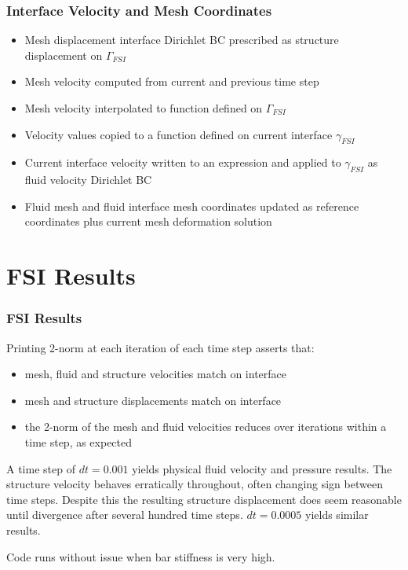 \documentclass{beamer}
\begin{document}
\begin{frame}
\frametitle{Interface Velocity and Mesh Coordinates}

\begin{itemize}
\item Mesh displacement interface Dirichlet BC prescribed as structure displacement on $\Gamma_{FSI}$
\item Mesh velocity computed from current and previous time step
\item Mesh velocity interpolated to function defined on $\Gamma_{FSI}$
\item Velocity values copied to a function defined on current interface $\gamma_{FSI}$
\item Current interface velocity written to an expression and applied to $\gamma_{FSI}$ as fluid velocity Dirichlet BC
\item Fluid mesh and fluid interface mesh coordinates updated as reference coordinates plus current mesh deformation solution 
\end{itemize}
\end{frame}




\section{FSI Results}
\begin{frame}
\frametitle{FSI Results}

Printing 2-norm at each iteration of each time step asserts that: 
\begin{itemize}
\item mesh, fluid and structure velocities match on interface
\item mesh and structure displacements match on interface
\item the 2-norm of the mesh and fluid velocities reduces over iterations within a time step, as expected
\end{itemize}

A time step of $dt = 0.001$  yields physical fluid velocity and pressure results. The structure velocity behaves erratically throughout, often changing sign between time steps. Despite this the resulting structure displacement does seem reasonable until divergence after several hundred time steps. $dt = 0.0005$ yields similar results. 

Code runs without issue when bar stiffness is very high. 

\end{frame}
\end{document}
